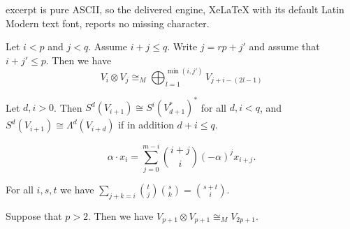 \documentclass[10pt,a4paper]{amsart}
\begin{document}
excerpt is pure ASCII, so the delivered engine, XeLaTeX with its default Latin Modern text font, reports no missing character.
\begin{Corollary}\label{newtensorformula}
Let $i<p$ and $j<q$. Assume $i+j \leq q$. Write $j = rp+ j'$ and assume that $i+j' \leq p$. Then we have
\begin{equation}\label{newtensorbyVj} V_i \otimes V_j \cong_M \bigoplus_{l=1}^{\min(i,j')} V_{j+i-(2l-1)}\end{equation}
\end{Corollary}

\begin{Proposition}\label{wildon}
Let $d,i>0$. Then  $S^d(V_{i+1}) \cong S^i(V_{d+1}^*)^*$ for all $d,i < q$, and $S^d(V_{i+1})  \cong \Lambda^d(V_{i+d})$ if in addition $d+i \leq q$.
\end{Proposition}

\begin{equation}\label{dualaction} \alpha \cdot x_i  = \sum_{j=0}^{m-i}\binom{i+j}{i}(-\alpha)^j x_{i+j}.
\end{equation}

\begin{Lemma}\label{morecombs}
For all $i,s,t$ we have  $\sum_{j+k=i} \binom{t}{j}\binom{s}{k} =  \binom{s+t}{i}$.
\end{Lemma}

\begin{Lemma}\label{notenough} Suppose that $p>2$. Then we have $V_{p+1} \otimes V_{p+1} \cong_M V_{2p+1}$.
\end{Lemma}
\end{document}
